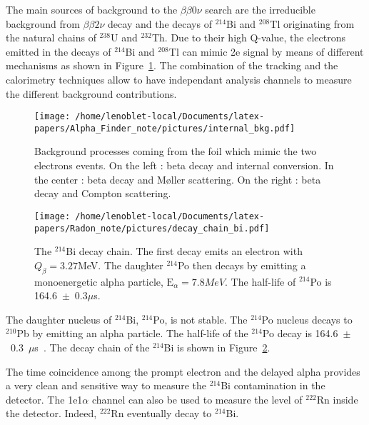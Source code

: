\documentclass[main.tex]{subfiles}
\begin{document}
\noindent The main sources of background to the $\beta \beta 0 \nu$ search are the irreducible background from $\beta \beta 2 \nu$ decay and the decays of $^{214}$Bi and $^{208}$Tl originating from the natural chains of $^{238}$U and $^{232}$Th. Due to their high Q-value, the electrons emitted in the decays of $^{214}$Bi and $^{208}$Tl can mimic 2e signal by means of different mechanisms as
shown in Figure~\ref{Backgroungs}. The combination of the tracking and the calorimetry techniques allow to have independant analysis channels to measure the different background contributions.

\begin{figure}[h!]
\begin{center}
\texttt{[image: /home/lenoblet-local/Documents/latex-papers/Alpha\_Finder\_note/pictures/internal\_bkg.pdf]}
\caption{Background processes coming from the foil which mimic the two electrons events. On the left : beta decay and internal conversion. In the center : beta decay and M\o ller scattering. On the right : beta decay and Compton scattering.}
\label{Backgroungs}
\end{center}
\end{figure}

\begin{figure}[h!]
\begin{center}
\texttt{[image: /home/lenoblet-local/Documents/latex-papers/Radon\_note/pictures/decay\_chain\_bi.pdf]}
\caption{The $^{214}$Bi decay chain. The first decay emits an electron with $Q_{\beta} = 3.27$MeV. The daughter $^{214}$Po then decays by emitting a monoenergetic alpha particle, $\text{E}_{\alpha} = 7.8 MeV$. The half-life of $^{214}$Po is 164.6~$\pm$~0.3$\mu$s.}
\label{BiPoChain}
\end{center}
\end{figure}

\bigskip 

\noindent The daughter nucleus of $^{214}$Bi, $^{214}$Po, is not stable. The $^{214}$Po nucleus decays to $^{210}$Pb by emitting an alpha particle. The half-life of the $^{214}$Po decay is 164.6~$\pm$~0.3~$\mu$s~\cite{Polonium}. The decay chain of the $^{214}$Bi is shown in Figure~\ref{BiPoChain}.  

\bigskip

\noindent The time coincidence among the prompt electron and the delayed alpha provides a very clean and sensitive way to measure the $^{214}$Bi contamination in the detector. The 1e1$\alpha$ channel can also be used to measure the level of $^{222}$Rn inside the detector. Indeed, $^{222}$Rn eventually decay to $^{214}$Bi.
\end{document}
